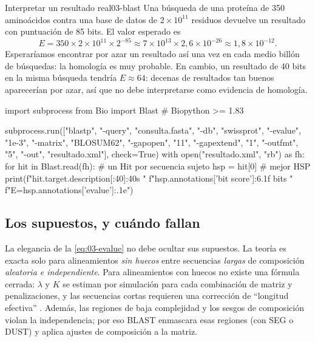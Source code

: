 \begin{ejemplo}{Interpretar un resultado real}{03-blast}
Una búsqueda  de una proteína de 350 aminoácidos contra una base de datos de $2\times10^{11}$ residuos devuelve un resultado con puntuación de 85 bits. El valor esperado es
\[
E = 350\times 2\times10^{11}\times 2^{-85} \approx 7\times10^{13}\times 2{,}6\times10^{-26} \approx 1{,}8\times10^{-12}.
\]
Esperaríamos encontrar por azar un resultado así una vez en cada medio billón de búsquedas: la homología es muy probable. En cambio, un resultado de 40 bits en la misma búsqueda tendría $E\approx 64$: decenas de resultados tan buenos aparecerían por azar, así que no debe interpretarse como evidencia de homología.
\end{ejemplo}

\begin{codigo}
import subprocess
from Bio import Blast                                       # Biopython >= 1.83

subprocess.run(["blastp", "-query", "consulta.fasta", "-db", "swissprot",
                "-evalue", "1e-3", "-matrix", "BLOSUM62",
                "-gapopen", "11", "-gapextend", "1",
                "-outfmt", "5", "-out", "resultado.xml"], check=True)
with open("resultado.xml", "rb") as fh:
    for hit in Blast.read(fh):                              # un Hit por secuencia sujeto
        hsp = hit[0]                                        # mejor HSP
        print(f"{hit.target.description[:40]:40s} "
              f"{hsp.annotations['bit score']:6.1f} bits  "
              f"E={hsp.annotations['evalue']:.1e}")
\end{codigo}

\subsection{Los supuestos, y cuándo fallan}

La elegancia de la \cref{eq:03-evalue} no debe ocultar sus supuestos. La teoría es exacta solo para alineamientos \emph{sin huecos} entre secuencias \emph{largas} de composición \emph{aleatoria e independiente}. Para alineamientos con huecos no existe una fórmula cerrada: $\lambda$ y $K$ se estiman por simulación para cada combinación de matriz y penalizaciones, y las secuencias cortas requieren una corrección de ``longitud efectiva'' \parencite{c03-karlin1990b,c03-altschul1997}. Además, las regiones de baja complejidad y los sesgos de composición violan la independencia; por eso BLAST enmascara esas regiones (con SEG o DUST) y aplica ajustes de composición a la matriz.

